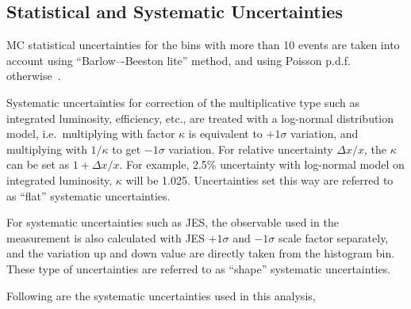 \subsection{
  Statistical and Systematic Uncertainties
}

\gls{MC} statistical uncertainties for the bins with more than 10 events
are taken into account using ``Barlow–-Beeston lite'' method,
and using Poisson \gls{p.d.f.} otherwise~\cite{Barlow1993}.

Systematic uncertainties
for correction of the multiplicative type such as integrated luminosity, efficiency, etc.,
are treated with a log-normal distribution model,
i.e.~multiplying with factor \( \kappa \) is equivalent to
\( +1 \sigma \) variation, and
multiplying with \( 1/\kappa \) to get \( -1\sigma \) variation. For relative
uncertainty \(\Delta x / x \), the \( \kappa \) can be set as \( 1 + \Delta x / x \).
For example, 2.5\% uncertainty with log-normal model on integrated luminosity,
\( \kappa \) will be 1.025. Uncertainties set this way
are referred to as ``flat'' systematic uncertainties.

For systematic uncertainties such as \gls{JES}, the observable
used in the measurement is also calculated with \gls{JES} \( +1\sigma \)
and \( -1\sigma \) scale factor separately, and the variation up and down
value are directly taken from the histogram bin. These type of uncertainties
are referred to as ``shape'' systematic uncertainties.

Following are the systematic uncertainties used in this analysis,

